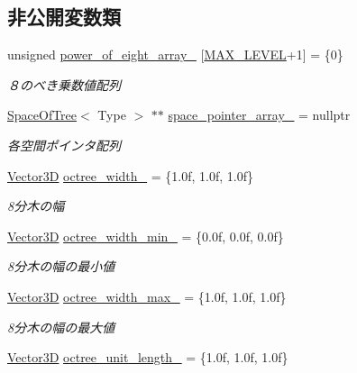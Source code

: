 \subsection*{非公開変数類}
\begin{DoxyCompactItemize}
\item 
unsigned \mbox{\hyperlink{class_liner_octree_ab7ddbc8f86cfa3ff46f01f080b56572a}{power\+\_\+of\+\_\+eight\+\_\+array\+\_\+}} \mbox{[}\mbox{\hyperlink{class_liner_octree_aced865f2822181486eb805e4db1f0a32}{M\+A\+X\+\_\+\+L\+E\+V\+EL}}+1\mbox{]} = \{0\}
\begin{DoxyCompactList}\small\item\em ８のべき乗数値配列 \end{DoxyCompactList}\item 
\mbox{\hyperlink{class_space_of_tree}{Space\+Of\+Tree}}$<$ Type $>$ $\ast$$\ast$ \mbox{\hyperlink{class_liner_octree_a0ffc2effd42779c7f88c4eecc8a68bfb}{space\+\_\+pointer\+\_\+array\+\_\+}} = nullptr
\begin{DoxyCompactList}\small\item\em 各空間ポインタ配列 \end{DoxyCompactList}\item 
\mbox{\hyperlink{class_vector3_d}{Vector3D}} \mbox{\hyperlink{class_liner_octree_a4c710ef0e4ea86372d80d88051815026}{octree\+\_\+width\+\_\+}} = \{1.\+0f, 1.\+0f, 1.\+0f\}
\begin{DoxyCompactList}\small\item\em 8分木の幅 \end{DoxyCompactList}\item 
\mbox{\hyperlink{class_vector3_d}{Vector3D}} \mbox{\hyperlink{class_liner_octree_a5992f986cf372dc2467c4dd2dec8771b}{octree\+\_\+width\+\_\+min\+\_\+}} = \{0.\+0f, 0.\+0f, 0.\+0f\}
\begin{DoxyCompactList}\small\item\em 8分木の幅の最小値 \end{DoxyCompactList}\item 
\mbox{\hyperlink{class_vector3_d}{Vector3D}} \mbox{\hyperlink{class_liner_octree_a29578ee8b44b1da05dadc291cfc4c354}{octree\+\_\+width\+\_\+max\+\_\+}} = \{1.\+0f, 1.\+0f, 1.\+0f\}
\begin{DoxyCompactList}\small\item\em 8分木の幅の最大値 \end{DoxyCompactList}\item 
\mbox{\hyperlink{class_vector3_d}{Vector3D}} \mbox{\hyperlink{class_liner_octree_a732a1f9bd3674be516c46d5805719e11}{octree\+\_\+unit\+\_\+length\+\_\+}} = \{1.\+0f, 1.\+0f, 1.\+0f\}
$$
\end{DoxyCompactItemize}
